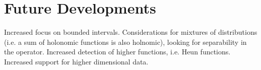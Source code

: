 \documentclass{article}
\begin{document}
\section{Future Developments}
Increased focus on bounded intervals.
Considerations for mixtures of distributions (i.e. a sum of holonomic functions is also holnomic), looking for separability in the operator.
Increased detection of higher functions, i.e. Heun functions.
Increased support for higher dimensional data.


{}

\end{document}
